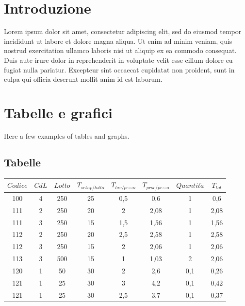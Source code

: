 \documentclass{FR16}
\begin{document}
\maketitle

\tableofcontents
\newpage

\section{Introduzione}
Lorem ipsum dolor sit amet, consectetur adipiscing elit, sed do eiusmod tempor incididunt ut labore et dolore magna aliqua. Ut enim ad minim veniam, quis nostrud exercitation ullamco laboris nisi ut aliquip ex ea commodo consequat. Duis aute irure dolor in reprehenderit in voluptate velit esse cillum dolore eu fugiat nulla pariatur. Excepteur sint occaecat cupidatat non proident, sunt in culpa qui officia deserunt mollit anim id est laborum.
\newpage

\section{Tabelle e grafici}
Here a few examples of tables and graphs.
\subsection{Tabelle}
\begin{center}
\begin{tabular}{c c c c c c c c}
\arrayrulecolor{Azzurro}
\hline
{\bfseries $Codice$} & {\bfseries $CdL$} & {\bfseries $Lotto$} & {\bfseries $T_{setup/lotto}$} & {\bfseries $T_{lav/pezzo}$} & {\bfseries $T_{proc/pezzo}$} & {\bfseries$Quantit\grave{a}$} & {\bfseries $T_{tot}$}\\
\hline
100 & 4 & 250 & 25 & 0,5 & 0,6 & 1 & 0,6\\
111 & 2 & 250 & 20 & 2 & 2,08 & 1 & 2,08 \\
111 & 3 & 250 & 15 & 1,5 & 1,56 & 1 & 1,56 \\
112 & 2 & 250 & 20 & 2,5 & 2,58 & 1 & 2,58 \\
112 & 3 & 250 & 15 & 2 & 2,06 & 1 & 2,06\\
113 & 3 & 500 & 15 & 1 & 1,03 & 2 & 2,06\\
120 & 1 & 50 & 30 & 2 & 2,6 & 0,1 & 0,26\\
121 & 1 & 25 & 30 & 3 & 4,2 & 0,1 & 0,42 \\
121 & 1 & 25 & 30 & 2,5 & 3,7 & 0,1 & 0,37 \\
\hline
\end{tabular}
\end{center}
\end{document}
